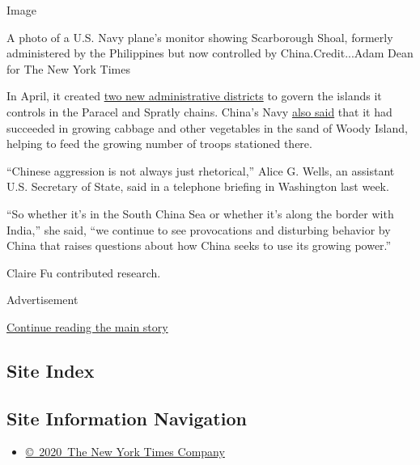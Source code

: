 Image

A photo of a U.S. Navy plane's monitor showing Scarborough Shoal,
formerly administered by the Philippines but now controlled by
China.Credit...Adam Dean for The New York Times

In April, it created
\href{https://amti.csis.org/fishing-while-the-water-is-muddy-chinas-newly-announced-administrative-districts-in-the-south-china-sea/}{two
new administrative districts} to govern the islands it controls in the
Paracel and Spratly chains. China's Navy
\href{https://www.globaltimes.cn/content/1188873.shtml}{also said} that
it had succeeded in growing cabbage and other vegetables in the sand of
Woody Island, helping to feed the growing number of troops stationed
there.

``Chinese aggression is not always just rhetorical,'' Alice G. Wells, an
assistant U.S. Secretary of State, said in a telephone briefing in
Washington last week.

``So whether it's in the South China Sea or whether it's along the
border with India,'' she said, ``we continue to see provocations and
disturbing behavior by China that raises questions about how China seeks
to use its growing power.''

Claire Fu contributed research.

Advertisement

\protect\hyperlink{after-bottom}{Continue reading the main story}

\hypertarget{site-index}{%
\subsection{Site Index}\label{site-index}}

\hypertarget{site-information-navigation}{%
\subsection{Site Information
Navigation}\label{site-information-navigation}}

\begin{itemize}
\tightlist
\item
  \href{https://help.nytimes.com/hc/en-us/articles/115014792127-Copyright-notice}{©~2020~The
  New York Times Company}
\end{itemize}


